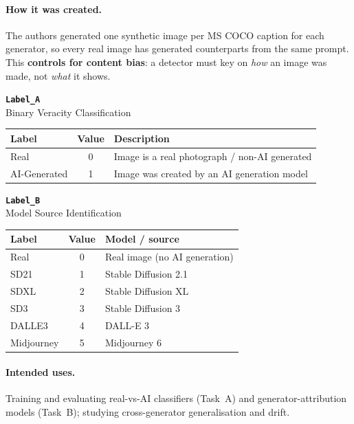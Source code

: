 \documentclass[11pt]{article}
\begin{document}
\medskip

\paragraph{How it was created.} The authors generated one synthetic image per MS COCO caption for each generator, so every real image has generated counterparts from the same prompt. This \textbf{controls for content bias}: a detector must key on \emph{how} an image was made, not \emph{what} it shows.

\medskip
\medskip

\medskip
\noindent
\begin{minipage}[t]{0.48\textwidth}
\small\centering
\textbf{\texttt{Label\_A}}\\
Binary Veracity Classification\\[3pt]
\begin{tabularx}{\linewidth}{@{}l c Y@{}}
\toprule
\textbf{Label} & \textbf{Value} & \textbf{Description} \\
\midrule
Real & 0 & Image is a real photograph / non-AI generated \\
AI-Generated & 1 & Image was created by an AI generation model \\
\bottomrule
\end{tabularx}
\end{minipage}\hfill
\begin{minipage}[t]{0.48\textwidth}
\small\centering
\textbf{\texttt{Label\_B}}\\
Model Source Identification\\[3pt]
\begin{tabularx}{\linewidth}{@{}l c Y@{}}
\toprule
\textbf{Label} & \textbf{Value} & \textbf{Model / source} \\
\midrule
Real & 0 & Real image (no AI generation) \\
SD21 & 1 & Stable Diffusion 2.1 \\
SDXL & 2 & Stable Diffusion XL \\
SD3 & 3 & Stable Diffusion 3 \\
DALLE3 & 4 & DALL-E 3 \\
Midjourney & 5 & Midjourney 6 \\
\bottomrule
\end{tabularx}
\end{minipage}


\paragraph{Intended uses.} Training and evaluating real-vs-AI classifiers (Task~A) and generator-attribution models (Task~B); studying cross-generator generalisation and drift.
\end{document}
